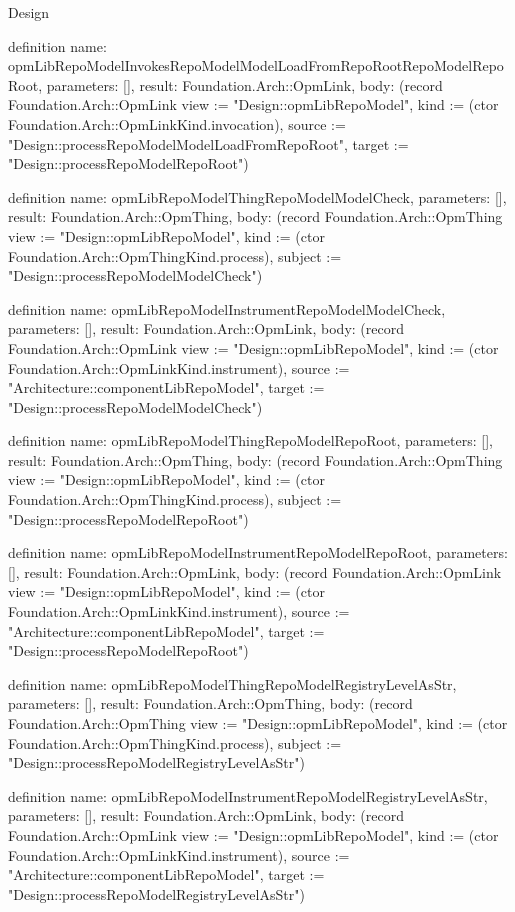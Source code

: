 \begin{lexlean}{Design}
\begin{semanticmodule}
definition{
  name: opmLibRepoModelInvokesRepoModelModelLoadFromRepoRootRepoModelRepoRoot,
  parameters: [],
  result: Foundation.Arch::OpmLink,
  body: (record Foundation.Arch::OpmLink {view := "Design::opmLibRepoModel", kind := (ctor Foundation.Arch::OpmLinkKind.invocation), source := "Design::processRepoModelModelLoadFromRepoRoot", target := "Design::processRepoModelRepoRoot"})
}

definition{
  name: opmLibRepoModelThingRepoModelModelCheck,
  parameters: [],
  result: Foundation.Arch::OpmThing,
  body: (record Foundation.Arch::OpmThing {view := "Design::opmLibRepoModel", kind := (ctor Foundation.Arch::OpmThingKind.process), subject := "Design::processRepoModelModelCheck"})
}

definition{
  name: opmLibRepoModelInstrumentRepoModelModelCheck,
  parameters: [],
  result: Foundation.Arch::OpmLink,
  body: (record Foundation.Arch::OpmLink {view := "Design::opmLibRepoModel", kind := (ctor Foundation.Arch::OpmLinkKind.instrument), source := "Architecture::componentLibRepoModel", target := "Design::processRepoModelModelCheck"})
}

definition{
  name: opmLibRepoModelThingRepoModelRepoRoot,
  parameters: [],
  result: Foundation.Arch::OpmThing,
  body: (record Foundation.Arch::OpmThing {view := "Design::opmLibRepoModel", kind := (ctor Foundation.Arch::OpmThingKind.process), subject := "Design::processRepoModelRepoRoot"})
}

definition{
  name: opmLibRepoModelInstrumentRepoModelRepoRoot,
  parameters: [],
  result: Foundation.Arch::OpmLink,
  body: (record Foundation.Arch::OpmLink {view := "Design::opmLibRepoModel", kind := (ctor Foundation.Arch::OpmLinkKind.instrument), source := "Architecture::componentLibRepoModel", target := "Design::processRepoModelRepoRoot"})
}

definition{
  name: opmLibRepoModelThingRepoModelRegistryLevelAsStr,
  parameters: [],
  result: Foundation.Arch::OpmThing,
  body: (record Foundation.Arch::OpmThing {view := "Design::opmLibRepoModel", kind := (ctor Foundation.Arch::OpmThingKind.process), subject := "Design::processRepoModelRegistryLevelAsStr"})
}

definition{
  name: opmLibRepoModelInstrumentRepoModelRegistryLevelAsStr,
  parameters: [],
  result: Foundation.Arch::OpmLink,
  body: (record Foundation.Arch::OpmLink {view := "Design::opmLibRepoModel", kind := (ctor Foundation.Arch::OpmLinkKind.instrument), source := "Architecture::componentLibRepoModel", target := "Design::processRepoModelRegistryLevelAsStr"})
}


\end{semanticmodule}
\end{lexlean}
